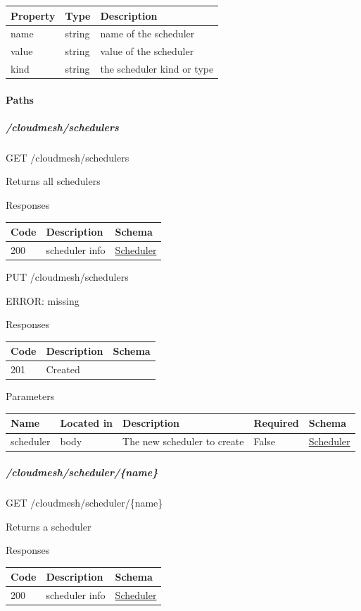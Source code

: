 \documentclass[9pt,]{article}
\let\oldparagraph\paragraph
\renewcommand{\paragraph}[1]{\oldparagraph{#1}\mbox{}}
\let\oldsubparagraph\subparagraph
\renewcommand{\subparagraph}[1]{\oldsubparagraph{#1}\mbox{}}
\begin{document}
\begin{longtable}[]{@{}lll@{}}
\toprule
Property & Type & Description\tabularnewline
\midrule
\endhead
name & string & name of the scheduler\tabularnewline
value & string & value of the scheduler\tabularnewline
kind & string & the scheduler kind or type\tabularnewline
\bottomrule
\end{longtable}

\hypertarget{paths-12}{%
\paragraph{Paths}\label{paths-12}}

\hypertarget{cloudmeshschedulers}{%
\subparagraph{/cloudmesh/schedulers}\label{cloudmeshschedulers}}

GET /cloudmesh/schedulers

Returns all schedulers

Responses

\begin{longtable}[]{@{}lll@{}}
\toprule
Code & Description & Schema\tabularnewline
\midrule
\endhead
200 & scheduler info &
\protect\hyperlink{scheduler}{Scheduler}\tabularnewline
\bottomrule
\end{longtable}

PUT /cloudmesh/schedulers

ERROR: missing

Responses

\begin{longtable}[]{@{}lll@{}}
\toprule
Code & Description & Schema\tabularnewline
\midrule
\endhead
201 & Created &\tabularnewline
\bottomrule
\end{longtable}

Parameters

\begin{longtable}[]{@{}lllll@{}}
\toprule
Name & Located in & Description & Required & Schema\tabularnewline
\midrule
\endhead
scheduler & body & The new scheduler to create & False &
\protect\hyperlink{scheduler}{Scheduler}\tabularnewline
\bottomrule
\end{longtable}

\hypertarget{cloudmeshschedulername}{%
\subparagraph{/cloudmesh/scheduler/\{name\}}\label{cloudmeshschedulername}}

GET /cloudmesh/scheduler/\{name\}

Returns a scheduler

Responses

\begin{longtable}[]{@{}lll@{}}
\toprule
Code & Description & Schema\tabularnewline
\midrule
\endhead
200 & scheduler info &
\protect\hyperlink{scheduler}{Scheduler}\tabularnewline
\bottomrule
\end{longtable}
\end{document}
